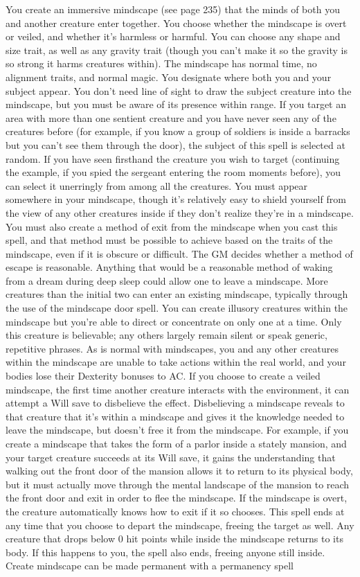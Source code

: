 {You create an immersive mindscape (see page 235) that the minds of both you and another creature enter together. You choose whether the mindscape is overt or veiled, and whether it's harmless or harmful. You can choose any shape and size trait, as well as any gravity trait (though you can't make it so the gravity is so strong it harms creatures within). The mindscape has normal time, no alignment traits, and normal magic.  You designate where both you and your subject appear. You don't need line of sight to draw the subject creature into the mindscape, but you must be aware of its presence within range. If you target an area with more than one sentient creature and you have never seen any of the creatures before (for example, if you know a group of soldiers is inside a barracks but you can't see them through the door), the subject of this spell is selected at random. If you have seen firsthand the creature you wish to target (continuing the example, if you spied the sergeant entering the room moments before), you can select it unerringly from among all the creatures. You must appear somewhere in your mindscape, though it's relatively easy to shield yourself from the view of any other creatures inside if they don't realize they're in a mindscape. You must also create a method of exit from the mindscape when you cast this spell, and that method must be possible to achieve based on the traits of the mindscape, even if it is obscure or difficult. The GM decides whether a method of escape is reasonable. Anything that would be a reasonable method of waking from a dream during deep sleep could allow one to leave a mindscape.  More creatures than the initial two can enter an existing mindscape, typically through the use of the mindscape door spell. You can create illusory creatures within the mindscape  but you're able to direct or concentrate on only one at a time. Only this creature is believable; any others largely remain silent or speak generic, repetitive phrases.  As is normal with mindscapes, you and any other creatures within the mindscape are unable to take actions within the real world, and your bodies lose their Dexterity bonuses to AC.  If you choose to create a veiled mindscape, the first time another creature interacts with the environment, it can attempt a Will save to disbelieve the effect. Disbelieving a mindscape reveals to that creature that it's within a mindscape and gives it the knowledge needed to leave the mindscape, but doesn't free it from the mindscape. For example, if you create a mindscape that takes the form of a parlor inside a stately mansion, and your target creature succeeds at its Will save, it gains the understanding that walking out the front door of the mansion allows it to return to its physical body, but it must actually move through the mental landscape of the mansion to reach the front door and exit in order to flee the mindscape. If the mindscape is overt, the creature automatically knows how to exit if it so chooses.  This spell ends at any time that you choose to depart the mindscape, freeing the target as well. Any creature that drops below 0 hit points while inside the mindscape returns to its body. If this happens to you, the spell also ends, freeing anyone still inside.  Create mindscape can be made permanent with a permanency spell }
